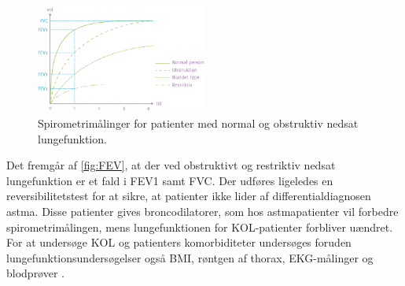 \begin{figure} [H]
\centering
\includegraphics[width=0.5\textwidth]{figures/FEV}
\caption{Spirometrimålinger for patienter med normal og obstruktiv nedsat lungefunktion.}
\label{fig:FEV}
\end{figure} 

\noindent
Det fremgår af \autoref{fig:FEV}, at der ved obstruktivt og restriktiv nedsat lungefunktion er et fald i FEV1 samt FVC. Der udføres ligeledes en reversibilitetstest for at sikre, at patienter ikke lider af differentialdiagnosen astma. Disse patienter gives broncodilatorer, som hos astmapatienter vil forbedre spirometrimålingen, mens lungefunktionen for KOL-patienter forbliver uændret.\cite{Basisbogen2016, Sundhed2013} 
For at undersøge KOL og patienters komorbiditeter undersøges foruden lungefunktionsundersøgelser også BMI, røntgen af thorax, EKG-målinger og blodprøver \cite{Sundhed2013}. 
